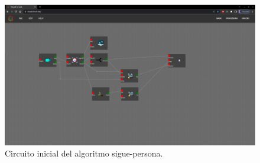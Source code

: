 \newpage
\begin{figure} [H]
    \begin{center}
        \includegraphics[width=12cm]{figs/c5/follow_person_final_model.png}
    \end{center}
    \caption[Circuito sigue-personas inicial]{Circuito inicial del algoritmo sigue-persona.}
    \label{fig:initial_follow_person}
\end{figure}







